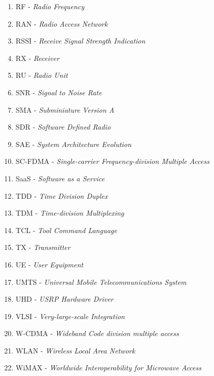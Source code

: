 \begin{enumerate}
  \item RF - \textit{Radio Frequency}
  \item RAN - \textit{Radio Access Network}
  \item RSSI - \textit{Receive Signal Strength Indication}
  \item RX - \textit{Receiver}
  \item RU - \textit{Radio Unit}

  \item SNR - \textit{Signal to Noise Rate}
  \item SMA - \textit{Subminiature Version A}
  \item SDR - \textit{Software Defined Radio}
  \item SAE - \textit{System Architecture Evolution}
  \item SC-FDMA - \textit{Single-carrier Frequency-division Multiple Access}
  \item SaaS - \textit{Software as a Service}

  \item TDD - \textit{Time Division Duplex}
  \item TDM - \textit{Time-division Multiplexing}
  \item TCL - \textit{Tool Command Language}
  \item TX - \textit{Transmitter}

  \item UE - \textit{User Equipment}
  \item UMTS - \textit{Universal Mobile Telecommunications System}
  \item UHD - \textit{USRP Hardware Driver}

  \item VLSI - \textit{Very-large-scale Integration}

  \item W-CDMA - \textit{Wideband Code division multiple access}
  \item WLAN - \textit{Wireless Local Area Network}
	\item WiMAX - \textit{Worldwide Interoperability for Microwave Access}

\end{enumerate}
